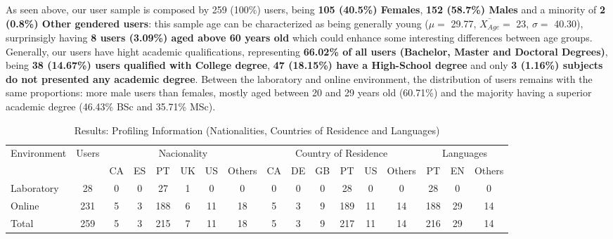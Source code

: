 %
As seen above, our user sample is composed by 259 (100\%) users, being \textbf{105 (40.5\%) Females}, \textbf{152 (58.7\%) Males} and a minority of \textbf{2 (0.8\%) Other gendered users}: this sample age can
be characterized as being generally young ($\mu =$ 29.77, $\overline{X_{Age}} =$ 23, $\sigma =$ 40.30), surprinsigly having \textbf{8 users (3.09\%) aged above 60 years old} which could enhance some interesting
differences between age groups. Generally, our users have hight academic qualifications, representing \textbf{66.02\% of all users (Bachelor, Master and Doctoral Degrees)}, being \textbf{38 (14.67\%) users
qualified with College degree}, \textbf{47 (18.15\%) have a High-School degree} and only \textbf{3 (1.16\%) subjects do not presented any academic degree}. Between the laboratory and online environment, the distribution
of users remains with the same proportions: more male users than females, mostly aged between 20 and 29 years old (60.71\%) and the majority having a superior academic degree (46.43\% BSc and 35.71\% MSc). \par
%
\begin{table}[htbp]
  \resizebox{\textwidth}{!} {
  \begin{tabular}{| l || c || c | c | c | c | c | c || c | c | c | c | c | c || c | c | c |}
    \hline
    \multicolumn{1}{|c||}{\multirow{2}{*}{Environment}} & \multirow{2}{*}{Users} & \multicolumn{6}{c||}{Nacionality} & \multicolumn{6}{c||}{Country of Residence} & \multicolumn{3}{c|}{Languages} \\ \cline{3-17}
    \multicolumn{1}{|c||}{}                             &                        & CA  & ES & PT & UK & US & Others & CA   & DE   & GB   & PT   & US  & Others  & PT      & EN      & Others     \\ \hline
    Laboratory                                         & 28                     & 0   & 0  & 27 & 1  & 0  & 0      & 0    & 0    & 0    & 28   & 0   & 0       & 28      & 0       & 0          \\ \hline
    Online                                             & 231                    & 5   & 3  & 188& 6  & 11 & 18     & 5    & 3    & 9    & 189  & 11  & 14      & 188     & 29      & 14         \\ \hline \hline
    Total                                              & 259                    & 5   & 3  & 215& 7  & 11 & 18     & 5    & 3    & 9    & 217  & 11  & 14      & 216     & 29      & 14         \\ \hline
  \end{tabular}}
  \caption[Results: Profiling Information (Nationalities, Countries of Residence and Languages)]{Results: Profiling Information (Nationalities, Countries of Residence and Languages)}
  \label{table:profiling_nacionalities}
\end{table}
